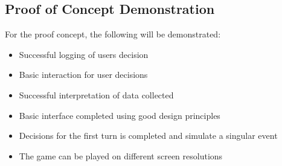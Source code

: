 \documentclass{article}
\begin{document}
\subsection{Proof of Concept Demonstration}
For the proof concept, the following will be demonstrated:
\begin{itemize}
    \item Successful logging of users decision
    \item Basic interaction for user decisions
    \item Successful interpretation of data collected
    \item Basic interface completed using good design principles
    \item Decisions for the first turn is completed and simulate a singular event
    \item The game can be played on different screen resolutions 
\end{itemize}
\end{document}
